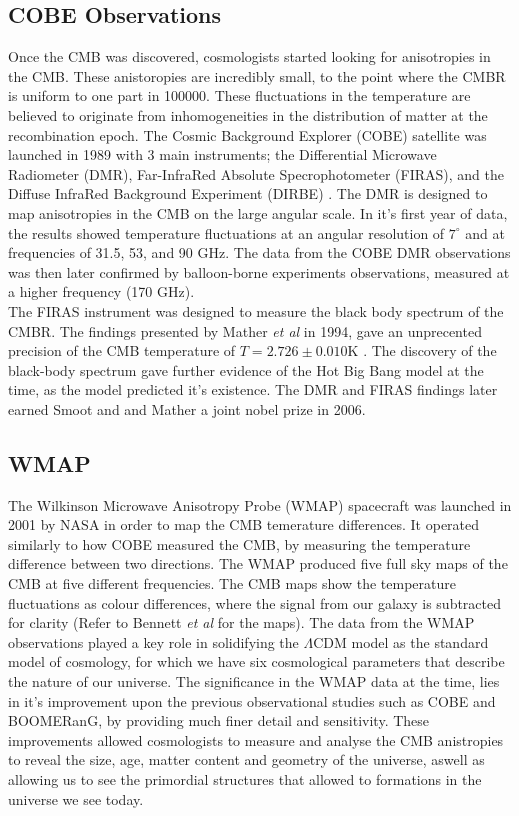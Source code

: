 \documentclass[twocolumn, prl, nobalancelastpage, aps, citeautoscript, longbibliography, 10pt]{revtex4-1}
\begin{document}
\subsection{COBE Observations}
Once the CMB was discovered, cosmologists started looking for anisotropies in the CMB. These anistoropies are incredibly small, to the point where the CMBR is uniform to one part 
in 100000. These fluctuations in the temperature are believed to originate from inhomogeneities in the distribution of matter at the recombination epoch\cite{Wright}.
The Cosmic Background Explorer (COBE) 
satellite was launched in 1989 with 3 main instruments; the Differential Microwave Radiometer (DMR), Far-InfraRed Absolute 
Specrophotometer (FIRAS), and the Diffuse InfraRed Background Experiment (DIRBE) \cite{Leverington}. The DMR is designed to 
map anisotropies in the CMB on the  large angular scale. In it's first year of data, the results showed temperature fluctuations 
at an angular resolution of $7^\circ$ and at frequencies of 31.5, 53, and 90 GHz\cite{Smoot}. The data from the COBE DMR 
observations was then later confirmed by balloon-borne experiments observations, measured at a higher frequency (170 GHz)\cite{Ganga}. 
\\The FIRAS instrument was designed to measure the black body spectrum of the CMBR. The findings presented by Mather \textit{et al} in 1994, 
gave an unprecented precision of the CMB temperature of $T = 2.726 \pm 0.010$K \cite{Mather}. The discovery of the black-body 
spectrum gave further evidence of the Hot Big Bang model at the time, as the model predicted it's existence. The DMR and FIRAS 
findings later earned Smoot and and Mather a joint nobel prize in 2006. 

\subsection{WMAP}
The Wilkinson Microwave Anisotropy Probe (WMAP) spacecraft was launched in 2001 by NASA in order to map the CMB temerature differences. It 
operated similarly to how COBE measured the CMB, by measuring the temperature difference between two directions. The WMAP produced five full sky maps of the CMB at 
five different frequencies. The CMB maps show the temperature fluctuations as colour differences, where the signal from our galaxy is subtracted for clarity (Refer 
to Bennett \textit{et al} \cite{WMAP 2003}for the maps). The data from the WMAP observations played a key role in solidifying the $\Lambda$CDM model as the standard model 
of cosmology, for which we have six cosmological parameters that describe the nature of our universe. The significance in the WMAP data at the time, lies in it's improvement upon 
the previous observational studies such as COBE and BOOMERanG, by providing much finer detail and sensitivity. These improvements allowed cosmologists to measure and analyse the 
CMB anistropies to reveal the size, age, matter content and geometry of the universe, aswell as allowing us to see the primordial structures that allowed to formations in the
universe we see today. 
\end{document}

